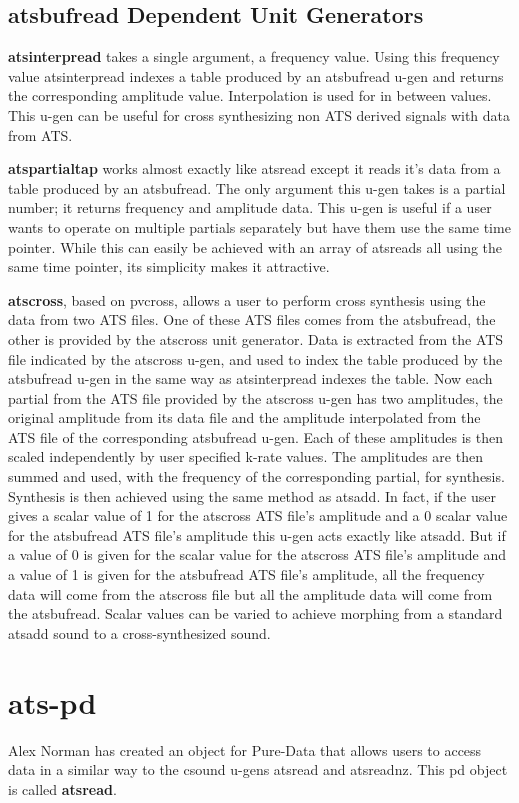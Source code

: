 \documentclass[10pt,letterpaper]{article}
\begin{document}
\subsection{atsbufread Dependent Unit Generators}
\textbf{atsinterpread} takes a single argument, a frequency value.  Using this frequency value atsinterpread indexes a table produced by an atsbufread u-gen and returns the corresponding amplitude value.  Interpolation is used for in between values.  This u-gen can be useful for cross synthesizing non ATS derived signals with data from ATS.

\textbf{atspartialtap} works almost exactly like atsread except it reads it's data from a table produced by an atsbufread.  The only argument this u-gen takes is a partial number; it returns frequency and amplitude data.  This u-gen is useful if a user wants to operate on multiple partials separately but have them use the same time pointer.  While this can easily be achieved with an array of atsreads all using the same time pointer, its simplicity makes it attractive.

\textbf{atscross}, based on pvcross, allows a user to perform cross synthesis using the data from two ATS files.  One of these ATS files comes from the atsbufread, the other is provided by the atscross unit generator.  Data is extracted from the ATS file indicated by the atscross u-gen, and used to index the table produced by the atsbufread u-gen in the same way as atsinterpread indexes the table.  Now each partial from the ATS file provided by the atscross u-gen has two amplitudes, the original amplitude from its data file and the amplitude interpolated from the ATS file of the corresponding atsbufread u-gen.  Each of these amplitudes is then scaled independently by user specified k-rate values.  The amplitudes are then summed and used, with the frequency of the corresponding partial, for synthesis.  Synthesis is then achieved using the same method as atsadd.  In fact, if the user gives a scalar value of 1 for the atscross ATS file's amplitude and a 0 scalar value for the atsbufread ATS file's amplitude this u-gen acts exactly like atsadd.  But if a value of 0 is given for the scalar value for the atscross ATS file's amplitude and a value of 1 is given for the atsbufread ATS file's amplitude, all the frequency data will come from the atscross file but all the amplitude data will come from the atsbufread.  Scalar values can be varied to achieve morphing from a standard atsadd sound to a cross-synthesized sound.

\section{ats-pd}
Alex Norman has created an object for Pure-Data that allows users to access data in a similar way to the csound u-gens atsread and atsreadnz.  This pd object is called \textbf{atsread}.
\end{document}
